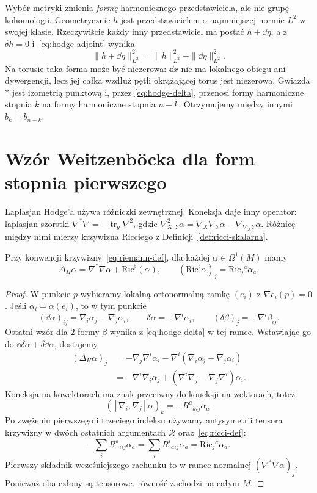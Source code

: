 Wybór metryki zmienia \emph{formę} harmonicznego
przedstawiciela, ale nie grupę kohomologii.
Geometrycznie $h$ jest przedstawicielem o najmniejszej
normie $L^2$ w swojej klasie. Rzeczywiście każdy inny
przedstawiciel ma postać $h+\dd\eta$, a z
$\delta h=0$ i~\eqref{eq:hodge-adjoint} wynika
\[
 \|h+\dd\eta\|_{L^2}^2
 =\|h\|_{L^2}^2+\|\dd\eta\|_{L^2}^2.
\]
Na torusie taka forma może być niezerowa: $\dd x$
nie ma lokalnego obiegu ani dywergencji, lecz jej całka
wzdłuż pętli okrążającej torus jest niezerowa.
Gwiazda $*$ jest izometrią punktową i, przez
\eqref{eq:hodge-delta}, przenosi formy harmoniczne
stopnia $k$ na formy harmoniczne stopnia $n-k$.
Otrzymujemy między innymi $b_k=b_{n-k}$.

\section{Wzór Weitzenböcka dla form stopnia pierwszego}
\label{sec:bochner-weitzenbock}

Laplasjan Hodge'a używa różniczki zewnętrznej.
Koneksja daje inny operator: laplasjan szorstki
$\nabla^*\nabla=-\operatorname{tr}_g\nabla^2$, gdzie
$\nabla^2_{X,Y}\alpha
=\nabla_X\nabla_Y\alpha-\nabla_{\nabla_XY}\alpha$.
Różnicę między nimi mierzy krzywizna Ricciego
z Definicji~\ref{def:ricci-skalarna}.

\begin{twierdzenie}
\label{thm:weitzenbock-one-forms}
Przy konwencji krzywizny~\eqref{eq:riemann-def},
dla każdej $\alpha\in\Omega^1(M)$ mamy
\begin{equation}\label{eq:weitzenbock-one-forms}
 \Delta_H\alpha=\nabla^*\nabla\alpha
                      +\mathrm{Ric}^{\sharp}(\alpha),
 \qquad
 (\mathrm{Ric}^{\sharp}\alpha)_j
   =\mathrm{Ric}_j{}^a\alpha_a.
\end{equation}
\end{twierdzenie}
\begin{proof}
W punkcie $p$ wybieramy lokalną ortonormalną ramkę
$(e_i)$ z $\nabla e_i(p)=0$. Jeśli
$\alpha_i=\alpha(e_i)$, to w tym punkcie
\[
 (\dd\alpha)_{ij}=\nabla_i\alpha_j-\nabla_j\alpha_i,
 \qquad \delta\alpha=-\nabla^i\alpha_i,
 \qquad (\delta\beta)_j=-\nabla^i\beta_{ij}.
\]
Ostatni wzór dla $2$-formy $\beta$ wynika z
\eqref{eq:hodge-delta} w tej ramce. Wstawiając go do
$\dd\delta\alpha+\delta\dd\alpha$, dostajemy
\begin{align*}
 (\Delta_H\alpha)_j
 &=-\nabla_j\nabla^i\alpha_i
   -\nabla^i(\nabla_i\alpha_j-\nabla_j\alpha_i)\\
 &=-\nabla^i\nabla_i\alpha_j
   +(\nabla^i\nabla_j-\nabla_j\nabla^i)\alpha_i.
\end{align*}
Koneksja na kowektorach ma znak przeciwny do koneksji
na wektorach, toteż
\[
 ([\nabla_i,\nabla_j]\alpha)_k
 =-R^a{}_{kij}\alpha_a.
\]
Po zwężeniu pierwszego i trzeciego indeksu używamy
antysymetrii tensora krzywizny w dwóch ostatnich
argumentach $\mathcal R$ oraz~\eqref{eq:ricci-def}:
\[
 -\sum_i R^a{}_{iij}\alpha_a
 =\sum_iR^i{}_{aij}\alpha_a
 =\mathrm{Ric}_j{}^a\alpha_a.
\]
Pierwszy składnik wcześniejszego rachunku to w ramce
normalnej $(\nabla^*\nabla\alpha)_j$. Ponieważ oba
człony są tensorowe, równość zachodzi na całym $M$.
\end{proof}

